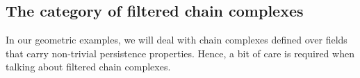 

\subsection{The category of filtered chain complexes}\label{se:fcc}

In our geometric examples, we will deal with chain complexes defined over fields that carry non-trivial persistence properties. Hence, a bit of care is required when talking about filtered chain complexes. \\


